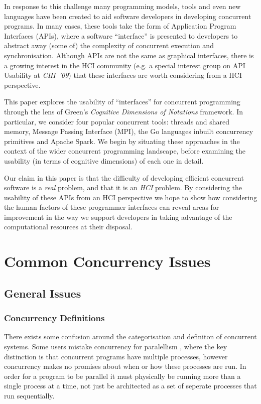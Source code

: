 \documentclass{sig-alternate}
\begin{document}
In response to this challenge many programming models, tools and even new languages have been created to aid software developers in developing concurrent programs. In many cases, these tools take the form of Application Program Interfaces (APIs), where a software ``interface'' is presented to developers to abstract away (some of) the complexity of concurrent execution and synchronisation. Although APIs are not the same as graphical interfaces, there is a growing interest in the HCI community (e.g. a special interest group on API Usability at \emph{CHI~'09}\cite{daughtry_api_2009}) that these interfaces are worth considering from a HCI perspective.

This paper explores the usability of ``interfaces'' for concurrent programming through the lens of Green's \emph{Cognitive Dimensions of  Notations} framework\cite{green89:_cognit_dimen_notat}. In particular, we consider four popular concurrent tools: threads and shared memory, Message Passing Interface (MPI), the Go languages inbuilt concurrency primitives and Apache Spark.  We begin by situating these approaches in the context of the wider concurrent programming landscape, before examining the usability (in terms of cognitive dimensions) of each one in detail.

Our claim in this paper is that the difficulty of developing efficient concurrent software is a \emph{real} problem, and that it is an \emph{HCI} problem. By considering the usability of these APIs from an HCI perspective we hope to show how considering the human factors of these programmer interfaces can reveal areas for improvement in the way we support developers in taking advantage of the computational resources at their disposal.

\section{Common Concurrency Issues}
\subsection{General Issues}
\subsubsection{Concurrency Definitions}
There exists some confusion around the categorisation and definiton of concurrent systems. Some users mistake concurrency for paralellism \cite{pike13:_concur_paral}, where the key distinction is that concurrent programs have multiple processes, however concurrency makes no promises about when or how these processes are run. In order for a program to be parallel it must physically be running more than a single process at a time, not just be architected as a set of seperate processes that run sequentially.
\end{document}
